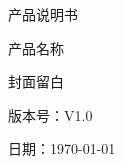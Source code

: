 \begin{titlepage}
\thispagestyle{empty}
\centering
{\Huge 产品说明书\par}
\vspace{2cm}
{\Large 产品名称\par}
\vspace*{\fill}
\begin{center}
{\large 封面留白}
\end{center}
\vspace*{\fill}
{\large 版本号：V1.0\par}
{\large 日期：\today\par}
\end{titlepage}
\clearpage
